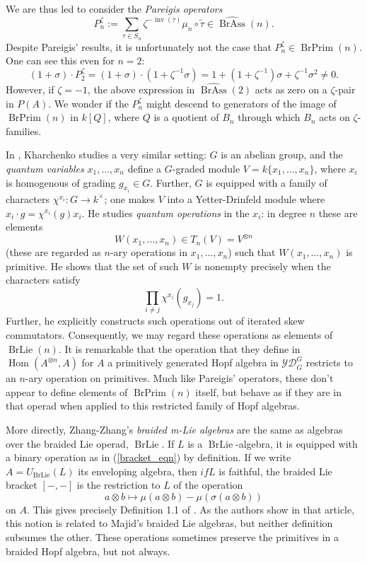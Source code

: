\documentclass[12pt]{article}
\DeclareMathOperator{\Hom}{Hom}
\DeclareMathOperator{\inv}{inv}
\DeclareMathOperator{\BrAss}{BrAss}
\DeclareMathOperator{\BrLie}{BrLie}
\DeclareMathOperator{\BrPrim}{BrPrim}
\newcommand{\BrAsshat}{\widehat{\BrAss}} %
\newcommand{\YD} {\mathcal{YD}}
\newcommand{\tautilde}{\widetilde{\tau}}
\newcommand{\beqn}{\begin{equation}}
\newcommand{\eeqn}{\end{equation}}
\theoremstyle{plain}
\theoremstyle{definition}
\theoremstyle{remark}
\begin{document}
We are thus led to consider the \emph{Pareigis operators}
%
$$P^{\zeta}_n:=\sum_{\tau \in S_n} \zeta^{-\inv(\tau)} \mu_n \circ \tautilde \in \BrAsshat(n).$$
%
Despite Pareigis' results, it is unfortunately not the case that $P^{\zeta}_n \in \BrPrim(n)$.  One can see this even for $n=2$:
%
$$(1+\sigma) \cdot P^{\zeta}_2 = (1+\sigma) \cdot(1+\zeta^{-1} \sigma) = 1+(1+\zeta^{-1})\sigma + \zeta^{-1} \sigma^2 \neq 0.$$
%
However, if $\zeta = -1$, the above expression in $\BrAsshat(2)$ acts as zero on a $\zeta$-pair in $P(A)$.  We wonder if the $P^{\zeta}_n$ might descend to generators of the image of $\BrPrim(n)$ in $k[Q]$, where $Q$ is a quotient of $B_n$ through which $B_n$ acts on $\zeta$-families.

In \cite{kharchenko_multilinear}, Kharchenko studies a very similar setting: $G$ is an abelian group, and the \emph{quantum variables} $x_1, \dots, x_n$ define a $G$-graded module $V = k\{x_1, \dots, x_n\}$, where $x_i$ is homogenous of grading $g_{x_i} \in G$.  Further, $G$ is equipped with a family of characters $\chi^{x_i}: G \to k^{\times}$; one makes $V$ into a Yetter-Drinfeld module where $x_i \cdot g = \chi^{x_i}(g) x_i$.  He studies \emph{quantum operations} in the $x_i$: in degree $n$ these are elements 
%
$$W(x_1, \dots, x_n) \in T_n(V) = V^{\otimes n}$$
%
(these are regarded as $n$-ary operations in $x_1, \dots, x_n$) such that $W(x_1, \dots, x_n)$ is primitive.  He shows that the set of such $W$ is nonempty precisely when the characters satisfy
%
$$\prod_{i \neq j} \chi^{x_i}(g_{x_j}) = 1.$$
%
Further, he explicitly constructs such operations out of iterated skew commutators.  Consequently, we may regard these operations as elements of $\BrLie(n)$.  It is remarkable that the operation that they define in $\Hom(A^{\otimes n}, A)$ for $A$ a primitively generated Hopf algebra in $\YD_G^G$ restricts to an $n$-ary operation on primitives.  Much like Pareigis' operators, these don't appear to define elements of $\BrPrim(n)$ itself, but behave as if they are in that operad when applied to this restricted family of Hopf algebras.

More directly, Zhang-Zhang's \emph{braided m-Lie algebras} are the same as algebras over the braided Lie operad, $\BrLie$.  If $L$ is a $\BrLie$-algebra, it is equipped with a binary operation as in (\ref{bracket_eqn}) by definition.  If we write $A=U_{\BrLie}(L)$ its enveloping algebra, then $if L$ is faithful, the braided Lie bracket $[-,-]$ is the restriction to $L$ of the operation
%
\beqn a \otimes b \mapsto \mu(a \otimes b) - \mu(\sigma(a \otimes b)) \label{zz_eqn} \eeqn
%
on $A$.  This gives precisely Definition 1.1 of \cite{zhang-zhang}.  As the authors show in that article, this notion is related to Majid's braided Lie algebras, but neither definition subsumes the other.  These operations sometimes preserve the primitives in a braided Hopf algebra, but not always.
\end{document}
